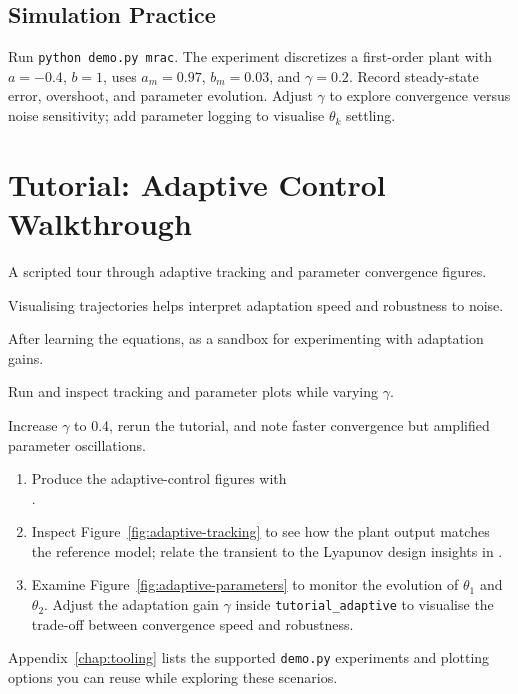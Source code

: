 \subsection{Simulation Practice}
Run \texttt{python demo.py mrac}. The experiment discretizes a first-order plant with $a=-0.4$, $b=1$, uses $a_m=0.97$, $b_m=0.03$, and $\gamma=0.2$. Record steady-state error, overshoot, and parameter evolution. Adjust $\gamma$ to explore convergence versus noise sensitivity; add parameter logging to visualise $\theta_k$ settling.

\section{Tutorial: Adaptive Control Walkthrough}
\begin{beginnerguide}
    \item[\textbf{What?}] A scripted tour through adaptive tracking and parameter convergence figures.
    \item[\textbf{Why?}] Visualising trajectories helps interpret adaptation speed and robustness to noise.
    \item[\textbf{When?}] After learning the equations, as a sandbox for experimenting with adaptation gains.
    \item[\textbf{How?}] Run  and inspect tracking and parameter plots while varying $\gamma$.
    \item[\textbf{Example}] Increase $\gamma$ to 0.4, rerun the tutorial, and note faster convergence but amplified parameter oscillations.
\end{beginnerguide}
\begin{enumerate}[leftmargin=*]
    \item Produce the adaptive-control figures with\\
    .
    \item Inspect Figure~\ref{fig:adaptive-tracking} to see how the plant output matches the reference model; relate the transient to the Lyapunov design insights in \textcite{krstic1995nonlinear}.
    \item Examine Figure~\ref{fig:adaptive-parameters} to monitor the evolution of $\theta_1$ and $\theta_2$. Adjust the adaptation gain $\gamma$ inside \texttt{tutorial\_adaptive} to visualise the trade-off between convergence speed and robustness.
\end{enumerate}
Appendix~\ref{chap:tooling} lists the supported \texttt{demo.py} experiments and plotting options you can reuse while exploring these scenarios.
